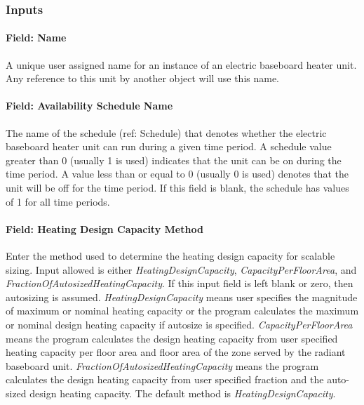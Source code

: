 \subsubsection{Inputs}\label{inputs-2-032}

\paragraph{Field: Name}\label{field-name-2-031}

A unique user assigned name for an instance of an electric baseboard heater unit. Any reference to this unit by another object will use this name.

\paragraph{Field: Availability Schedule Name}\label{field-availability-schedule-name-2-006}

The name of the schedule (ref: Schedule) that denotes whether the electric baseboard heater unit can run during a given time period. A schedule value greater than 0 (usually 1 is used) indicates that the unit can be on during the time period. A value less than or equal to 0 (usually 0 is used) denotes that the unit will be off for the time period. If this field is blank, the schedule has values of 1 for all time periods.

\paragraph{Field: Heating Design Capacity Method}\label{field-heating-design-capacity-method-2}

Enter the method used to determine the heating design capacity for scalable sizing. Input allowed is either \emph{HeatingDesignCapacity}, \emph{CapacityPerFloorArea}, and \emph{FractionOfAutosizedHeatingCapacity}. If this input field is left blank or zero, then autosizing is assumed. \emph{HeatingDesignCapacity} means user specifies the magnitude of maximum or nominal heating capacity or the program calculates the maximum or nominal design heating capacity if autosize is specified. \emph{CapacityPerFloorArea} means the program calculates the design heating capacity from user specified heating capacity per floor area and floor area of the zone served by the radiant baseboard unit. \emph{FractionOfAutosizedHeatingCapacity} means the program calculates the design heating capacity from user specified fraction and the auto-sized design heating capacity. The default method is \emph{HeatingDesignCapacity}.


